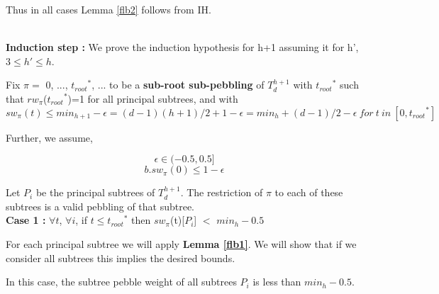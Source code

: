 \documentclass[12pt]{article}
\newenvironment{proofL}{\hspace{.4em}}
                      {\hspace{\fill}{$\blacksquare$} \smallskip}
\newcommand{\troots}{{t_{root}}^*}
\begin{document}
\begin{proofL}



Thus in all cases Lemma \ref{flb2} follows from IH.

\end{proofL}\\











\noindent
{\bf Induction step :} We prove the induction hypothesis for h+1 assuming it for h',
$3\le h' \le h$.

Fix $\pi =$ 0, ..., $\troots$, ... to be a {\bf sub-root sub-pebbling} of $T^{h+1}_d$ with $\troots$ such that $rw_\pi$($\troots$)=1 for all principal subtrees, and with
 \begin{equation}sw_{\pi}(t) \leq min_{h+1} - \epsilon = (d-1)(h+1)/2 + 1- \epsilon=  min_h +  (d-1)/2 - \epsilon~for~t~in~[0, \troots]\label{rtotal}\end{equation} 

\noindent
Further, we assume,

\begin{equation}\epsilon \in (-0.5,0.5]\label{aeps}\end{equation} 
\begin{equation}b.sw_{\pi}(0) \leq 1-\epsilon\label{swinit}\end{equation} 


Let $P_i$ be the principal subtrees of $T^{h+1}_d$.
The restriction of $\pi$ to each of these subtrees is a valid
pebbling of that subtree.\\

\noindent
{\bf Case 1 :} $\forall t$, $\forall i$, if $t \leq \troots$ then $sw_{\pi}$(t)[$P_i$] $<$ $min_h-0.5$ 

For each principal subtree we will apply {\bf Lemma \ref{flb1}}. We will show that if we consider all subtrees this implies the desired bounds.

In this case, the subtree pebble weight of all subtrees  $P_i$ is less than $min_h-0.5$.
\end{document}
